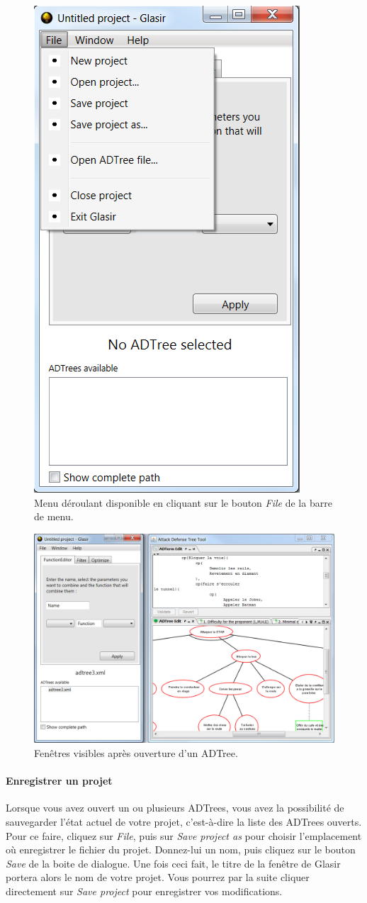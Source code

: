 	\begin{figure}[H]
        \centering
        \includegraphics[height=0.7\textwidth]{figure/openfile.png}
        \caption{Menu déroulant disponible en cliquant sur le bouton \emph{File} de la barre de menu.}
        \label{fig:file}
    \end{figure}
    
    \begin{figure}[H]
        \centering
        \includegraphics[height=0.7\textwidth]{figure/glasirAditoule.png}
        \caption{Fenêtres visibles après ouverture d'un ADTree.}
        \label{fig:gladitoule}
    \end{figure}

\paragraph{Enregistrer un projet} Lorsque vous avez ouvert un ou plusieurs ADTrees, vous avez la possibilité de sauvegarder l'état actuel de votre projet, c'est-à-dire la liste des ADTrees ouverts. Pour ce faire, cliquez sur \emph{File}, puis sur \emph{Save project as} pour choisir l'emplacement où enregistrer le fichier du projet. Donnez-lui un nom, puis cliquez sur le bouton \emph{Save} de la boite de dialogue. Une fois ceci fait, le titre de la fenêtre de Glasir portera alors le nom de votre projet. Vous pourrez par la suite cliquer directement sur \emph{Save project} pour enregistrer vos modifications.

